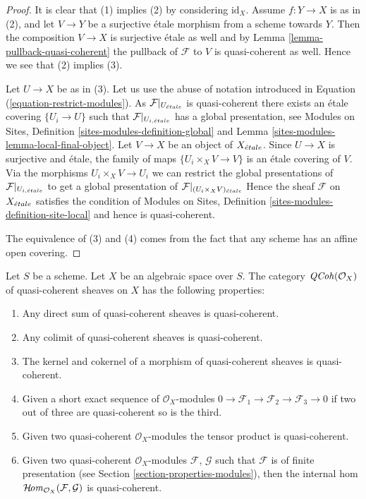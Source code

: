 \begin{proof}
It is clear that (1) implies (2) by considering $\text{id}_X$.
Assume $f : Y \to X$ is as in (2), and let $V \to Y$ be a surjective
\'etale morphism from a scheme towards $Y$. Then the composition $V \to X$ is
surjective \'etale as well
and by Lemma \ref{lemma-pullback-quasi-coherent} the pullback of $\mathcal{F}$
to $V$ is quasi-coherent as well. Hence we see that (2) implies (3).

\medskip\noindent
Let $U \to X$ be as in (3). Let us use the abuse of notation introduced
in Equation (\ref{equation-restrict-modules}).
As $\mathcal{F}|_{U_{\acute{e}tale}}$ is quasi-coherent there exists an
\'etale covering $\{U_i \to U\}$ such that
$\mathcal{F}|_{U_{i, {\acute{e}tale}}}$ has a global presentation, see
Modules on Sites, Definition \ref{sites-modules-definition-global} and
Lemma \ref{sites-modules-lemma-local-final-object}.
Let $V \to X$ be an object of $X_{\acute{e}tale}$. Since $U \to X$ is
surjective and \'etale, the family of maps $\{U_i \times_X V \to V\}$ is an
\'etale covering
of $V$. Via the morphisms $U_i \times_X V \to U_i$ we can restrict the
global presentations of $\mathcal{F}|_{U_{i, {\acute{e}tale}}}$ to get a global
presentation of $\mathcal{F}|_{(U_i \times_X V)_{\acute{e}tale}}$
Hence the sheaf $\mathcal{F}$ on $X_{\acute{e}tale}$ satisfies the condition of
Modules on Sites, Definition \ref{sites-modules-definition-site-local}
and hence is quasi-coherent.

\medskip\noindent
The equivalence of (3) and (4) comes from the fact that any scheme has
an affine open covering.
\end{proof}

\begin{lemma}
\label{lemma-properties-quasi-coherent}
Let $S$ be a scheme. Let $X$ be an algebraic space over $S$.
The category $\mathit{QCoh}(\mathcal{O}_X)$ of quasi-coherent sheaves on $X$
has the following properties:
\begin{enumerate}
\item Any direct sum of quasi-coherent sheaves is quasi-coherent.
\item Any colimit of quasi-coherent sheaves is quasi-coherent.
\item The kernel and cokernel of a morphism of quasi-coherent sheaves
is quasi-coherent.
\item Given a short exact sequence of $\mathcal{O}_X$-modules
$0 \to \mathcal{F}_1 \to \mathcal{F}_2 \to \mathcal{F}_3 \to 0$
if two out of three are quasi-coherent so is the third.
\item Given two quasi-coherent $\mathcal{O}_X$-modules
the tensor product is quasi-coherent.
\item Given two quasi-coherent $\mathcal{O}_X$-modules
$\mathcal{F}$, $\mathcal{G}$ such that $\mathcal{F}$
is of finite presentation (see
Section \ref{section-properties-modules}),
then the internal hom
$\mathop{\mathcal{H}\!\mathit{om}}\nolimits_{\mathcal{O}_X}(\mathcal{F}, \mathcal{G})$
is quasi-coherent.
\end{enumerate}
\end{lemma}

